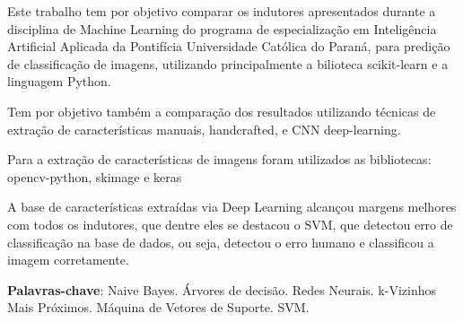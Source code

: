 \documentclass[
article,			%
11pt,				%
oneside,			%
a4paper,			%
english,			%
brazil,				%
sumario=tradicional,
]{abntex2}
\begin{document}
	
	
	\frenchspacing 
	
	
	
	\maketitle
	
	
	
	
	
	\begin{resumoumacoluna}
		Este trabalho tem por objetivo comparar os indutores apresentados durante a disciplina de Machine Learning do programa de especialização em Inteligência Artificial Aplicada da Pontifícia Universidade Católica do Paraná, para predição de classificação de imagens, utilizando principalmente a bilioteca scikit-learn e a linguagem Python.

		Tem por objetivo também a comparação dos resultados utilizando técnicas de extração de características manuais, handcrafted, e CNN deep-learning.

		Para a extração de características de imagens foram utilizados as bibliotecas: opencv-python, skimage e keras

		A base de características extraídas via Deep Learning alcançou margens melhores com todos os indutores, que dentre eles se destacou o SVM, que detectou erro de classificação na base de dados, ou seja, detectou o erro humano e classificou a imagem corretamente.
		
		\vspace{\onelineskip}
		
		\noindent
		\textbf{Palavras-chave}: Naive Bayes. Árvores de decisão. Redes Neurais. k-Vizinhos Mais Próximos. Máquina de Vetores de Suporte. SVM.
	\end{resumoumacoluna}
	
\end{document}
